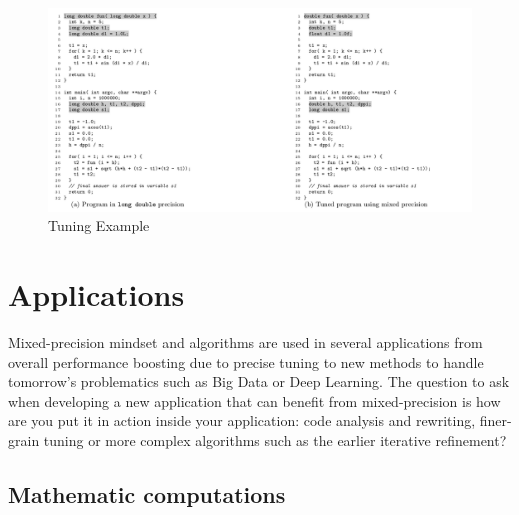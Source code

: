 \begin{figure}[htbp]
	\centering
		\includegraphics[width=17cm]{Figures/Tuning.png}
	\caption[Tuning]{Tuning Example \cite{Rubio2013}}
	\label{fig:Tuning}
\end{figure}


\section{Applications}

Mixed-precision mindset and algorithms are used in several applications from overall performance boosting due to precise tuning to new methods to handle tomorrow's problematics such as Big Data or Deep Learning. The question to ask when developing a new application that can benefit from mixed-precision is how are you put it in action inside your application: code analysis and rewriting, finer-grain tuning or more complex algorithms such as the earlier iterative refinement?


\subsection{Mathematic computations}

